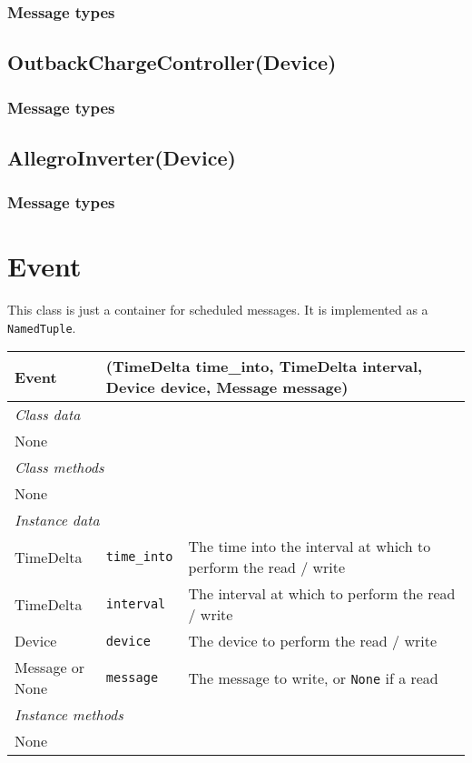 \documentclass[pdftex,oneside,12pt,a4paper]{book}
\begin{document}
\subsubsection{Message types}

\subsection{OutbackChargeController(Device)}
\subsubsection{Message types}

\subsection{AllegroInverter(Device)}
\subsubsection{Message types}

\section{Event}
This class is just a container for scheduled messages.  It is implemented as a \verb|NamedTuple|. 

\noindent
\begin{tabular}{|p{0.2\linewidth}p{0.18\linewidth}p{0.62\linewidth}|}
\hline
Event & \multicolumn{2}{l|}{(TimeDelta time\_into, TimeDelta interval, Device device, Message message)} \\
\hline\multicolumn{3}{|l|}{\small\emph{Class data}}\\
None && \\
\hline\multicolumn{3}{|l|}{\small\emph{Class methods}}\\
None && \\
\hline\multicolumn{3}{|l|}{\small\emph{Instance data}}\\
TimeDelta & \verb|time_into| & The time into the interval at which to perform the read / write\\
TimeDelta & \verb|interval| & The interval at which to perform the read / write\\
Device & \verb|device| & The device to perform the read / write\\
Message or None & \verb|message| & The message to write, or \verb|None| if a read\\
\hline\multicolumn{3}{|l|}{\small\emph{Instance methods}}\\
None \\\hline
\end{tabular}
\end{document}
